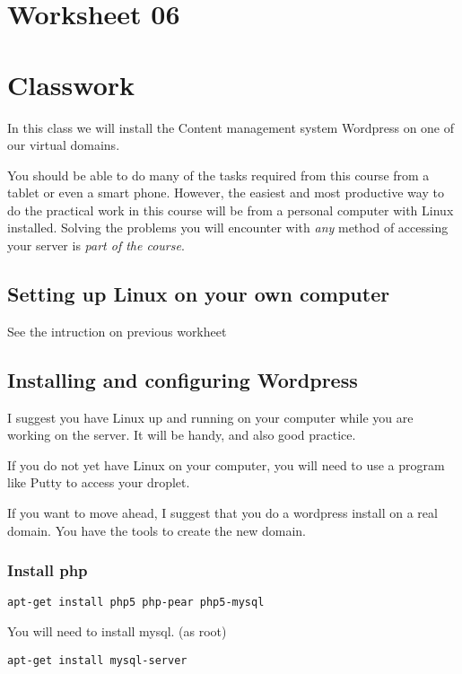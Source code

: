 \documentclass[12pt, a4paper]{article}
\begin{document}
\section*{Worksheet 06}


\section*{Classwork}
In this class we will install the Content management system Wordpress on one of our virtual domains.


You should be able to do many of the tasks required from this course from a tablet or even a smart phone. However, the easiest and most productive way to do the practical work in this course will be from a personal computer with Linux installed. Solving the problems you will encounter with \emph{any} method of accessing your server is \emph{part of the course}.

\subsection*{Setting up Linux on your own computer}

See the intruction on previous workheet

\subsection*{Installing and configuring Wordpress}


I suggest you have Linux up and running on your computer while you are working on the server. It will be handy, and also good practice.

If you do not yet have Linux on your computer, you will need to use a program like Putty to access your droplet.


If you want to move ahead, I suggest that you do a wordpress install on a real domain. You have the tools to create the new domain.

\subsubsection*{Install php}

\begin{verbatim}
apt-get install php5 php-pear php5-mysql
\end{verbatim}

You will need to install mysql. (as root)

\begin{verbatim}
apt-get install mysql-server
\end{verbatim}
\end{document}
